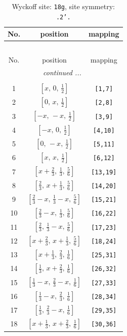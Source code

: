 \documentclass[fleqn,8pt]{jsarticle}
\begin{document}
\renewcommand{\arraystretch}{1.2}
\begin{longtable}{ccc}
\caption{Wyckoff site: {\tt 18g}, site symmetry: {\tt .2'.}}
 \\
 \hline \hline
No. & position & mapping \\ \hline \endfirsthead

\multicolumn{2}{l}{\tablename\ \thetable{}} \\
 \hline \hline
No. & position & mapping \\ \hline \endhead

 \hline \hline
\multicolumn{2}{r}{\footnotesize\it continued ...} \\ \endfoot

 \hline \hline
\multicolumn{2}{r}{} \\ \endlastfoot

1 & $\left[ x,\, 0,\, \frac{1}{2} \right]$ & {\tt [1,7]} \\ \hline
2 & $\left[ 0,\, x,\, \frac{1}{2} \right]$ & {\tt [2,8]} \\ \hline
3 & $\left[ - x,\, - x,\, \frac{1}{2} \right]$ & {\tt [3,9]} \\ \hline
4 & $\left[ - x,\, 0,\, \frac{1}{2} \right]$ & {\tt [4,10]} \\ \hline
5 & $\left[ 0,\, - x,\, \frac{1}{2} \right]$ & {\tt [5,11]} \\ \hline
6 & $\left[ x,\, x,\, \frac{1}{2} \right]$ & {\tt [6,12]} \\ \hline
7 & $\left[ x + \frac{2}{3},\, \frac{1}{3},\, \frac{5}{6} \right]$ & {\tt [13,19]} \\ \hline
8 & $\left[ \frac{2}{3},\, x + \frac{1}{3},\, \frac{5}{6} \right]$ & {\tt [14,20]} \\ \hline
9 & $\left[ \frac{2}{3} - x,\, \frac{1}{3} - x,\, \frac{5}{6} \right]$ & {\tt [15,21]} \\ \hline
10 & $\left[ \frac{2}{3} - x,\, \frac{1}{3},\, \frac{5}{6} \right]$ & {\tt [16,22]} \\ \hline
11 & $\left[ \frac{2}{3},\, \frac{1}{3} - x,\, \frac{5}{6} \right]$ & {\tt [17,23]} \\ \hline
12 & $\left[ x + \frac{2}{3},\, x + \frac{1}{3},\, \frac{5}{6} \right]$ & {\tt [18,24]} \\ \hline
13 & $\left[ x + \frac{1}{3},\, \frac{2}{3},\, \frac{1}{6} \right]$ & {\tt [25,31]} \\ \hline
14 & $\left[ \frac{1}{3},\, x + \frac{2}{3},\, \frac{1}{6} \right]$ & {\tt [26,32]} \\ \hline
15 & $\left[ \frac{1}{3} - x,\, \frac{2}{3} - x,\, \frac{1}{6} \right]$ & {\tt [27,33]} \\ \hline
16 & $\left[ \frac{1}{3} - x,\, \frac{2}{3},\, \frac{1}{6} \right]$ & {\tt [28,34]} \\ \hline
17 & $\left[ \frac{1}{3},\, \frac{2}{3} - x,\, \frac{1}{6} \right]$ & {\tt [29,35]} \\ \hline
18 & $\left[ x + \frac{1}{3},\, x + \frac{2}{3},\, \frac{1}{6} \right]$ & {\tt [30,36]} \\
\end{longtable}
\end{document}
